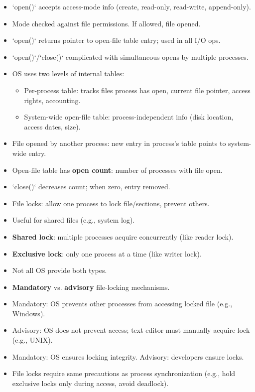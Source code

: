 \begin{itemize}
    \item `open()` accepts access-mode info (create, read-only, read-write, append-only).
    \item Mode checked against file permissions. If allowed, file opened.
    \item `open()` returns pointer to open-file table entry; used in all I/O ops.
    \item `open()`/`close()` complicated with simultaneous opens by multiple processes.
    \item OS uses two levels of internal tables:
    \begin{itemize}
        \item Per-process table: tracks files process has open, current file pointer, access rights, accounting.
        \item System-wide open-file table: process-independent info (disk location, access dates, size).
    \end{itemize}
    \item File opened by another process: new entry in process's table points to system-wide entry.
    \item Open-file table has \textbf{open count}: number of processes with file open.
    \item `close()` decreases count; when zero, entry removed.
    \item File locks: allow one process to lock file/sections, prevent others.
    \item Useful for shared files (e.g., system log).
    \item \textbf{Shared lock}: multiple processes acquire concurrently (like reader lock).
    \item \textbf{Exclusive lock}: only one process at a time (like writer lock).
    \item Not all OS provide both types.
    \item \textbf{Mandatory} vs. \textbf{advisory} file-locking mechanisms.
    \item Mandatory: OS prevents other processes from accessing locked file (e.g., Windows).
    \item Advisory: OS does not prevent access; text editor must manually acquire lock (e.g., UNIX).
    \item Mandatory: OS ensures locking integrity. Advisory: developers ensure locks.
    \item File locks require same precautions as process synchronization (e.g., hold exclusive locks only during access, avoid deadlock).
\end{itemize}

